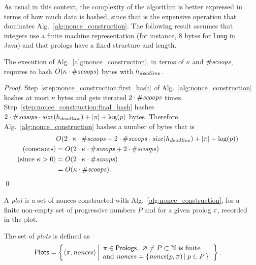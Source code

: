 %
As usual in this context, the complexity of the algorithm is better expressed
in terms of how much data is hashed, since that is the expensive operation that dominates
Alg.~\ref{alg:nonce_construction}. The following result assumes that
integers use a finite machine representation (for instance, $8$ bytes for \texttt{long} in Java)
and that prologs have a fixed structure and length.
%
\begin{proposition}\label{prop:nonce_construction_complexity}
  The execution of Alg.~\ref{alg:nonce_construction}, in terms
  of $\kappa$ and ${\#\mathit{scoops}}$, requires to hash
  $O(\kappa\cdot{\#\mathit{scoops}})$ bytes with $h_{\mathit{deadline}}$.
\end{proposition}
\begin{proof}
  Step~\ref{step:nonce_construction:first_hash} of Alg.~\ref{alg:nonce_construction}
  hashes at most $\kappa$ bytes and gets iterated $2\cdot{\#\mathit{scoops}}$ times.
  Step~\ref{step:nonce_construction:final_hash} hashes
  $2\cdot{\#\mathit{scoops}}\cdot{\mathit{size}}(h_{\mathit{deadline}})+|\pi|+\log(p)$ bytes. Therefore,
  Alg.~\ref{alg:nonce_construction} hashes a number of bytes that is
  \begin{align*}
    &O(2\cdot\kappa\cdot{\#\mathit{scoops}}+2\cdot{\#\mathit{scoops}}\cdot{\mathit{size}}(h_{\mathit{deadline}})+|\pi|+\log(p))\\
    \text{(constants)}&=O(2\cdot\kappa\cdot{\#\mathit{scoops}}+2\cdot{\#\mathit{scoops}})\\
    \text{(since $\kappa>0$)}&=O(2\cdot\kappa\cdot{\#\mathit{scoops}})\\
    &=O(\kappa\cdot{\#\mathit{scoops}}).
  \end{align*}
  \qed
\end{proof}
%
A \emph{plot} is a set of nonces constructed with Alg.~\ref{alg:nonce_construction},
for a finite non-empty set of progressive numbers $P$ and
for a given prolog $\pi$, recorded in the plot.
%
\begin{definition}[Plot]\label{def:plot}
  The set of \emph{plots} is defined as
  \[
  {\mathsf{Plots}}=\left\{\left<\pi,{\mathit{nonces}}\right>\left|\begin{array}{l}
  \pi\in{\mathsf{Prologs}},\ \varnothing\not=P\subset\mathbb{N}\text{ is finite}\\
  \text{and }{\mathit{nonces}}=\left\{{\mathit{nonce}}(p,\pi)\left|\;p\in P\right.\right\}
  \end{array}\right.\right\}.
  \]
\end{definition}
%
